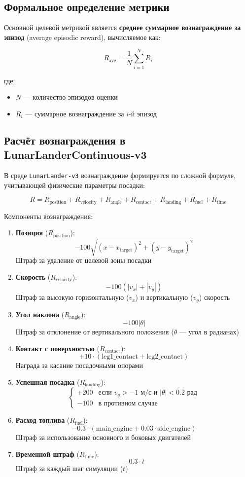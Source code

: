 \documentclass[a4paper,12pt]{article}
\begin{document}
\subsection{Формальное определение метрики}
Основной целевой метрикой является \textbf{среднее суммарное вознаграждение за эпизод} (average episodic reward), вычисляемое как:

\[
R_{\text{avg}} = \frac{1}{N} \sum_{i=1}^{N} R_i
\]

где:
\begin{itemize}
	\item $N$ — количество эпизодов оценки
	\item $R_i$ — суммарное вознаграждение за $i$-й эпизод
\end{itemize}

\subsection{Расчёт вознаграждения в LunarLanderContinuous-v3}
В среде \texttt{LunarLander-v3} вознаграждение формируется по сложной формуле, учитывающей физические параметры посадки:

\[
R = R_{\text{position}} + R_{\text{velocity}} + R_{\text{angle}} + R_{\text{contact}} + R_{\text{landing}} + R_{\text{fuel}} + R_{\text{time}}
\]

Компоненты вознаграждения:
\begin{enumerate}
	\item \textbf{Позиция} ($R_{\text{position}}$): 
	\[
	-100 \sqrt{(x - x_{\text{target}})^2 + (y - y_{\text{target}})^2}
	\]
	Штраф за удаление от целевой зоны посадки
	
	\item \textbf{Скорость} ($R_{\text{velocity}}$):
	\[
	-100 \left( |v_x| + |v_y| \right)
	\]
	Штраф за высокую горизонтальную ($v_x$) и вертикальную ($v_y$) скорость
	
	\item \textbf{Угол наклона} ($R_{\text{angle}}$):
	\[
	-100 |\theta|
	\]
	Штраф за отклонение от вертикального положения ($\theta$ — угол в радианах)
	
	\item \textbf{Контакт с поверхностью} ($R_{\text{contact}}$):
	\[
	+10 \cdot (\text{leg1\_contact} + \text{leg2\_contact})
	\]
	Награда за касание посадочными опорами
	
	\item \textbf{Успешная посадка} ($R_{\text{landing}}$):
	\[
	\begin{cases} 
		+200 & \text{если } v_y > -1 \text{ м/с и } |\theta| < 0.2 \text{ рад} \\
		-100 & \text{в противном случае}
	\end{cases}
	\]
	
	\item \textbf{Расход топлива} ($R_{\text{fuel}}$):
	\[
	-0.3 \cdot (\text{main\_engine} + 0.03 \cdot \text{side\_engine})
	\]
	Штраф за использование основного и боковых двигателей
	
	\item \textbf{Временной штраф} ($R_{\text{time}}$):
	\[
	-0.3 \cdot t
	\]
	Штраф за каждый шаг симуляции ($t$)
\end{enumerate}
\end{document}

